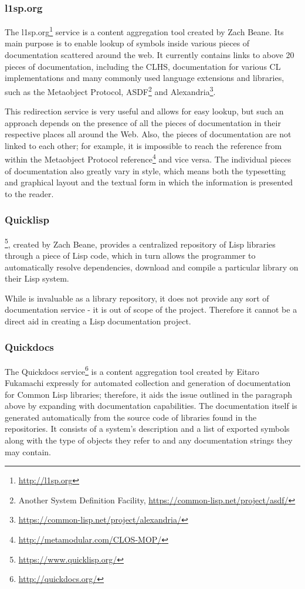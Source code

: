\subsubsection{l1sp.org}

The l1sp.org\footnote{\url{http://l1sp.org}} service is a content aggregation tool created by Zach Beane. Its main purpose is to enable lookup of symbols inside various pieces of documentation scattered around the web. It currently contains links to above 20 pieces of documentation, including the CLHS, documentation for various CL implementations and many commonly used language extensions and libraries, such as the Metaobject Protocol, ASDF\footnote{Another System Definition Facility, \url{https://common-lisp.net/project/asdf/}} and Alexandria\footnote{\url{https://common-lisp.net/project/alexandria/}}.

This redirection service is very useful and allows for easy lookup, but such an approach depends on the presence of all the pieces of documentation in their respective places all around the Web. Also, the pieces of documentation are not linked to each other; for example, it is impossible to reach the \cl{} reference from within the Metaobject Protocol reference\footnote{\url{http://metamodular.com/CLOS-MOP/}} and vice versa. The individual pieces of documentation also greatly vary in style, which means both the typesetting and graphical layout and the textual form in which the information is presented to the reader.

\subsubsection{Quicklisp}

\ql{}\footnote{\url{https://www.quicklisp.org/}}, created by Zach Beane, provides a centralized repository of Lisp libraries through a piece of Lisp code, which in turn allows the programmer to automatically resolve dependencies, download and compile a particular library on their Lisp system.

While \ql{} is invaluable as a library repository, it does not provide any sort of documentation service - it is out of scope of the \ql{} project. Therefore it cannot be a direct aid in creating a Lisp documentation project.

\subsubsection{Quickdocs}

The Quickdocs service\footnote{\url{http://quickdocs.org/}} is a content aggregation tool created by Eitaro Fukamachi expressly for automated collection and generation of documentation for Common Lisp libraries; therefore, it aids the issue outlined in the paragraph above by expanding \ql{} with documentation capabilities. The documentation itself is generated automatically from the source code of libraries found in the \ql{} repositories. It consists of a system's \ql{} description and a list of exported symbols along with the type of objects they refer to and any documentation strings they may contain.

